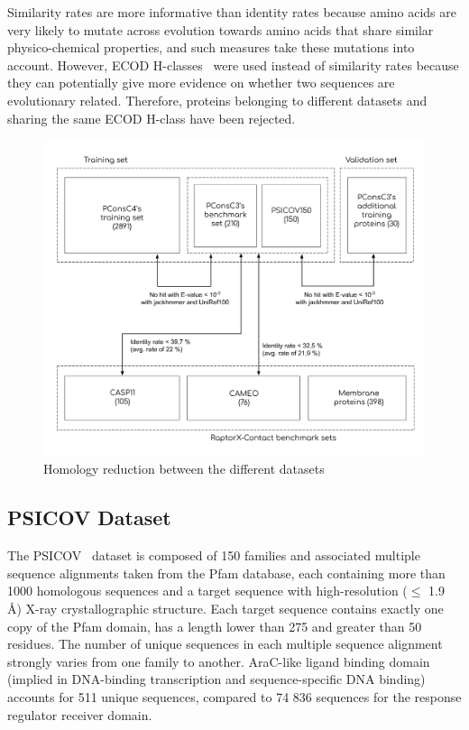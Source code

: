     Similarity rates are more informative than identity rates because amino acids
    are very likely to mutate across evolution towards amino acids that share
    similar physico-chemical properties, and such measures take these mutations
    into account. However, ECOD H-classes~\cite{10.1371/journal.pcbi.1003926}
    were used instead of similarity rates because they can potentially give more
    evidence on whether two sequences are evolutionary related.
    Therefore, proteins belonging to different datasets and sharing the same
    ECOD H-class have been rejected.


    \begin{figure}[H]
      \begin{center}
        \includegraphics[width=\textwidth, keepaspectratio]{imgs/datasets.png}
         \caption{Homology reduction between the different datasets}
        \label{homology_reduction}
      \end{center}
    \end{figure}

  \subsection{PSICOV Dataset}

    The PSICOV~\cite{doi:10.1093/bioinformatics/btr638} dataset is composed of 150 families
    and associated multiple sequence alignments
    taken from the Pfam database, each containing more than 1000 homologous sequences
    and a target sequence with high-resolution ($\le$ 1.9 \AA{}) X-ray crystallographic structure.
    Each target sequence contains exactly one copy of the Pfam domain, has a length lower than
    275 and greater than 50 residues. The number of unique sequences in each multiple sequence
    alignment strongly varies from one family to another.
    AraC-like ligand binding domain (implied in DNA-binding transcription and
    sequence-specific DNA binding) accounts for 511 unique sequences, compared to 74 836 sequences
    for the response regulator receiver domain.

